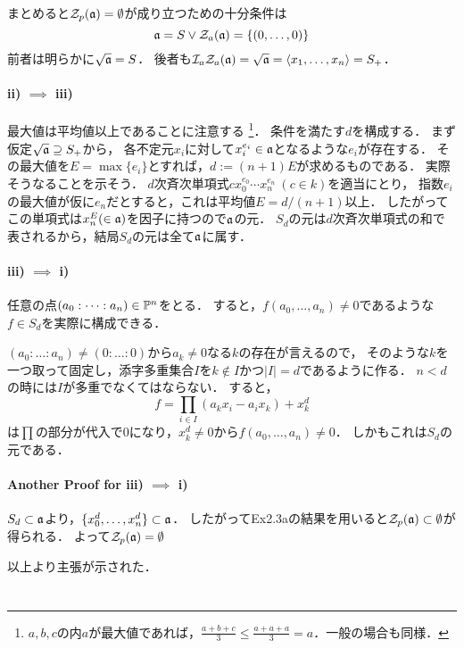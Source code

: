 \documentclass[a4paper]{jsarticle}
\begin{document}
    まとめると$\mathcal{Z}_p(\mathfrak{a})=\emptyset$が成り立つための十分条件は
    \[ \mathfrak{a}=S \lor \mathcal{Z}_a(\mathfrak{a})=\{(0,\dots,0)\} \]
    前者は明らかに$\sqrt{\mathfrak{a}}=S$．
    後者も$\mathcal{I}_a \mathcal{Z}_a(\mathfrak{a})=\sqrt{\mathfrak{a}}=\langle x_1,\dots,x_n \rangle=S_{+}$．

    \paragraph{ii) $\implies$ iii)}
    最大値は平均値以上であることに注意する
    \footnote{$a,b,c$の内$a$が最大値であれば，$\frac{a+b+c}{3} \leq \frac{a+a+a}{3}=a$．一般の場合も同様．}．
    条件を満たす$d$を構成する．
    まず仮定$\sqrt{\mathfrak{a}} \supseteq S_{+}$から，
    各不定元$x_i$に対して$x_i^{e_i} \in \mathfrak{a}$となるような$e_i$が存在する．
    その最大値を$E=\max\{e_i\}$とすれば，$d:=(n+1)E$が求めるものである．
    実際そうなることを示そう．
    $d$次斉次単項式$c x_0^{e_0} \cdots x_n^{e_n}~(c \in k)$を適当にとり，
    指数$e_i$の最大値が仮に$e_n$だとすると，これは平均値$E=d/(n+1)$以上．
    したがってこの単項式は$x_n^{E}(\in \mathfrak{a})$を因子に持つので$\mathfrak{a}$の元．
    $S_d$の元は$d$次斉次単項式の和で表されるから，結局$S_d$の元は全て$\mathfrak{a}$に属す．

    \paragraph{iii) $\implies$ i)}
    任意の点$(a_0: \dots: a_n) \in \mathbb{P}^n$をとる．
    すると，$f(a_0, \dots, a_n) \neq 0$であるような$f \in S_d$を実際に構成できる．

    $(a_0: \dots: a_n) \neq (0:\dots:0)$から$a_k \neq 0$なる$k$の存在が言えるので，
    そのような$k$を一つ取って固定し，添字多重集合$I$を$k \not \in I$かつ$|I|=d$であるように作る．
    $n < d$の時には$I$が多重でなくてはならない．
    すると，
    \[ f=\prod_{i \in I}(a_k x_i- a_i x_k) +x_k^d\]
    は$\prod$の部分が代入で0になり，$x_k^d \neq 0$から$f(a_0, \dots, a_n) \neq 0$．
    しかもこれは$S_d$の元である．

    \paragraph{Another Proof for iii) $\implies$ i)}
    $S_d \subset \mathfrak{a}$より，$\{x_0^d, \dots, x_n^d \} \subset \mathfrak{a}$．
    したがってEx2.3aの結果を用いると$\mathcal{Z}_p(\mathfrak{a}) \subset \emptyset$が得られる．
    よって$\mathcal{Z}_p(\mathfrak{a})=\emptyset$

    以上より主張が示された．

\section{ } %
\end{document}
